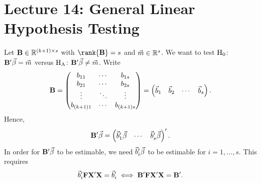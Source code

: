 \section{Lecture 14: General Linear Hypothesis Testing}
Let $ \mathbf{B}\in\mathbb{R}^{(k+1)\times s} $
with $ \rank{\Matrix{B}}=s $ and $ \vec{m}\in\mathbb{R}^s $.
We want to test $ \text{H}_0 $: $ \mathbf{B}'\vec{\beta}=\vec{m} $
versus $ \text{H}_{\text{A}} $: $ \mathbf{B}'\vec{\beta}\ne \vec{m} $. Write
\[ \mathbf{B}=\begin{pmatrix}
        b_{11}     & \cdots & b_{1s}     \\
        b_{21}     & \cdots & b_{2s}     \\
        \vdots     & \ddots & \vdots     \\
        b_{(k+1)1} & \cdots & b_{(k+1)s}
    \end{pmatrix}=\begin{pmatrix}
        \vec{b}_1 & \vec{b}_2 & \cdots & \vec{b}_s
    \end{pmatrix}. \]
Hence,
\[ \mathbf{B}'\vec{\beta}=
    \begin{pmatrix}
        \vec{b}_1' \vec{\beta} & \cdots & \vec{b}_s' \vec{\beta}
    \end{pmatrix}'. \]
In order for $ \mathbf{B}'\vec{\beta} $ to be estimable, we need
$ \vec{b}_i'\vec{\beta} $ to be estimable for $ i=1,\ldots,s $.
This requires
\[ \vec{b}_i'\mathbf{F}\mathbf{X}'\mathbf{X}=\vec{b}_i'
    \iff \mathbf{B}'\mathbf{F}\mathbf{X}'\mathbf{X}=\mathbf{B}'. \]
